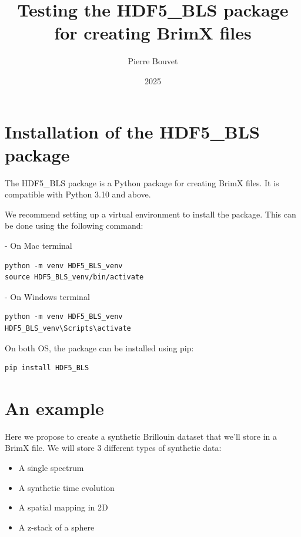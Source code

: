 \documentclass{article}
\title{Testing the HDF5\_BLS package for creating BrimX files}
\author{Pierre Bouvet}
\date{2025}
\begin{document}
\maketitle

\tableofcontents

\section{Installation of the HDF5\_BLS package}

The HDF5\_BLS package is a Python package for creating BrimX files. It is compatible with Python 3.10 and above. 

We recommend setting up a virtual environment to install the package. This can be done using the following command:

\begin{tcolorbox}[colback=blue!5, colframe=blue!40!black, boxrule=0.5mm, sharp corners, left=2mm, right=2mm, top=1mm, bottom=1mm]
- On Mac terminal
\begin{lstlisting}
python -m venv HDF5_BLS_venv
source HDF5_BLS_venv/bin/activate 
\end{lstlisting}
\end{tcolorbox}

\begin{tcolorbox}[colback=yellow!5, colframe=yellow!40!black, boxrule=0.5mm, sharp corners, left=2mm, right=2mm, top=1mm, bottom=1mm]
- On Windows terminal
\begin{lstlisting}
python -m venv HDF5_BLS_venv
HDF5_BLS_venv\Scripts\activate
\end{lstlisting}
\end{tcolorbox}

On both OS, the package can be installed using pip:
\begin{lstlisting}
pip install HDF5_BLS
\end{lstlisting}


\section{An example}

Here we propose to create a synthetic Brillouin dataset that we'll store in a BrimX file. We will store 3 different types of synthetic data:
\begin{itemize}
    \item A single spectrum 
    \item A synthetic time evolution
    \item A spatial mapping in 2D
    \item A z-stack of a sphere
\end{itemize}
\end{document}
